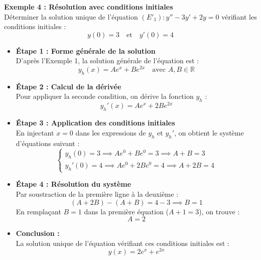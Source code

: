 \documentclass[12pt,a4paper]{article}
\begin{document}
\medskip

\textbf{Exemple 4 : Résolution avec conditions initiales} \\
Déterminer la solution unique de l'équation $(E'_1) : y'' - 3y' + 2y = 0$ vérifiant les conditions initiales :
\[ y(0) = 3 \quad \text{et} \quad y'(0) = 4 \]

\begin{itemize}
    \item \textbf{Étape 1 : Forme générale de la solution} \\
    D'après l'Exemple 1, la solution générale de l'équation est :
    \[ y_h(x) = A e^{x} + B e^{2x} \quad \text{avec } A, B \in \mathbb{R} \]
    
    \item \textbf{Étape 2 : Calcul de la dérivée} \\
    Pour appliquer la seconde condition, on dérive la fonction $y_h$ :
    \[ y_h'(x) = A e^{x} + 2B e^{2x} \]
    
    \item \textbf{Étape 3 : Application des conditions initiales} \\
    En injectant $x = 0$ dans les expressions de $y_h$ et $y_h'$, on obtient le système d'équations suivant :
    \[
    \begin{cases}
    y_h(0) = 3 \implies A e^{0} + B e^{0} = 3 \implies A + B = 3 \\
    y_h'(0) = 4 \implies A e^{0} + 2B e^{0} = 4 \implies A + 2B = 4
    \end{cases}
    \]
    
    \item \textbf{Étape 4 : Résolution du système} \\
    Par soustraction de la première ligne à la deuxième :
    \[ (A + 2B) - (A + B) = 4 - 3 \implies B = 1 \]
    En remplaçant $B = 1$ dans la première équation ($A + 1 = 3$), on trouve :
    \[ A = 2 \]
    
    \item \textbf{Conclusion :} \\
    La solution unique de l'équation vérifiant ces conditions initiales est :
    \[ \boxed{y(x) = 2e^{x} + e^{2x}} \]
\end{itemize}
\end{document}
